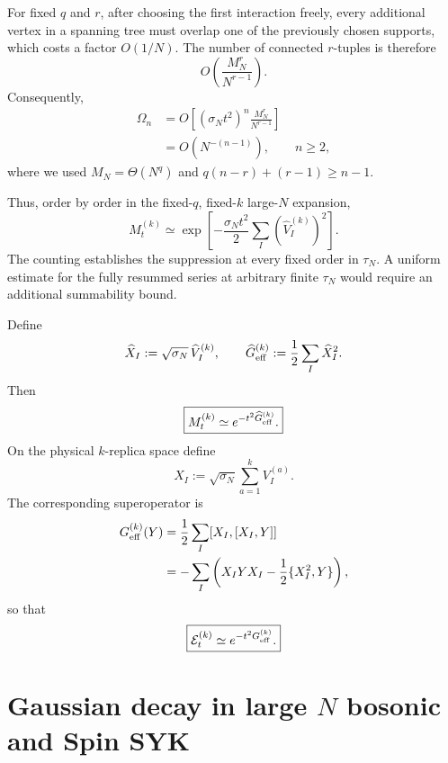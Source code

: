 \documentclass{article}
\theoremstyle{definition}
\begin{document}
For fixed $q$ and $r$, after choosing the first interaction freely, every
additional vertex in a spanning tree must overlap one of the previously
chosen supports, which costs a factor $O(1/N)$.  The number of connected
$r$-tuples is therefore
\begin{equation}
    O\!\left(\frac{M_N^r}{N^{r-1}}\right).
\end{equation}
Consequently,
\begin{align}
    \Omega_n
    &=O\!\left[
       (\sigma_Nt^2)^n
       \frac{M_N^r}{N^{r-1}}
    \right]
    \nonumber\\
    &=O(N^{-(n-1)}),
    \qquad n\ge2,
\end{align}
where we used $M_N=\Theta(N^q)$ and
$q(n-r)+(r-1)\ge n-1$.

Thus, order by order in the fixed-$q$, fixed-$k$ large-$N$ expansion,
\begin{equation}
    M_t^{(k)}
    \simeq
    \exp\!\left[
       -\frac{\sigma_Nt^2}{2}
       \sum_I(\widehat V_I^{(k)})^2
    \right].
\end{equation}
The counting establishes the suppression at every fixed order in $\tau_N$.
A uniform estimate for the fully resummed series at arbitrary finite
$\tau_N$ would require an additional summability bound.

Define
\begin{equation}
    \widehat X_I
    :=\sqrt{\sigma_N}\,\widehat V_I^{(k)},
    \qquad
    \widehat G_{\rm eff}^{(k)}
    :=\frac12\sum_I\widehat X_I^2.
\end{equation}
Then
\begin{equation}
    \boxed{
    M_t^{(k)}\simeq e^{-t^2\widehat G_{\rm eff}^{(k)}}.
    }
\end{equation}
On the physical $k$-replica space define
\begin{equation}
    X_I
    :=\sqrt{\sigma_N}\sum_{a=1}^kV_I^{(a)}.
\end{equation}
The corresponding superoperator is
\begin{align}
    G_{\rm eff}^{(k)}(Y)
    &=\frac12\sum_I[X_I,[X_I,Y]]
    \nonumber\\
    &=-\sum_I
    \left(
       X_IYX_I-\frac12\{X_I^2,Y\}
    \right),
\end{align}
so that
\begin{equation}
    \boxed{
    {\cal E}_t^{(k)}\simeq e^{-t^2G_{\rm eff}^{(k)}}.
    }
\end{equation}


\section{Gaussian decay in large $N$ bosonic and Spin SYK}
\label{sec:bosonic_spin_syk_gaussian_regulator}
\end{document}
